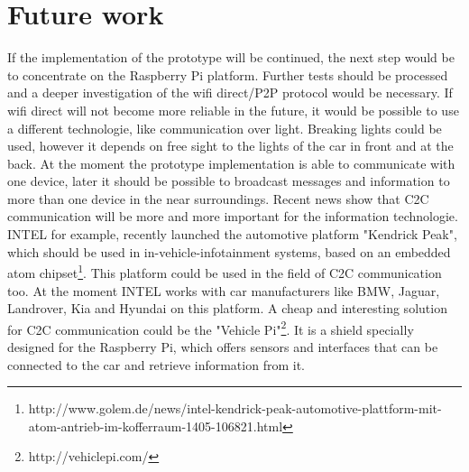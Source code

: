 \section{Future work}
\label{sec:FutureWork}
If the implementation of the prototype will be continued, the next step would be to concentrate on the Raspberry Pi platform. Further tests should be processed and a deeper investigation of the wifi direct/P2P protocol would be necessary. If wifi direct will not become more reliable in the future, it would be possible to use a different technologie, like communication over light. Breaking lights could be used, however it depends on free sight to the lights of the car in front and at the back. At the moment the prototype implementation is able to communicate with one device, later it should be possible to broadcast messages and information to more than one device in the near surroundings. Recent news show that C2C communication will be more and more important for the information technologie. INTEL for example, recently launched the automotive platform "Kendrick Peak", which should be used in in-vehicle-infotainment systems, based on an embedded atom chipset\footnote{http://www.golem.de/news/intel-kendrick-peak-automotive-plattform-mit-atom-antrieb-im-kofferraum-1405-106821.html}. This platform could be used in the field of C2C communication too. At the moment INTEL works with car manufacturers like BMW, Jaguar, Landrover, Kia and Hyundai on this platform. A cheap and interesting solution for C2C communication could be the "Vehicle Pi"\footnote{http://vehiclepi.com/}. It is a shield specially designed for the Raspberry Pi, which offers sensors and interfaces that can be connected to the car and retrieve information from it. 
